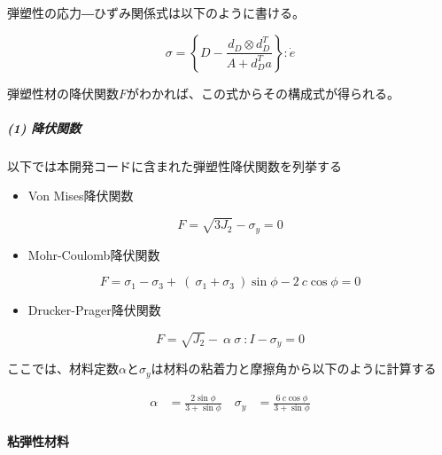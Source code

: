 \documentclass[a4paper,pandoc,ja=standard]{bxjsarticle}
\providecommand{\tightlist}{%
  \setlength{\itemsep}{0pt}\setlength{\parskip}{0pt}}
\let\oldparagraph\paragraph
\renewcommand{\paragraph}[1]{\oldparagraph{#1}\mbox{}}
\let\oldsubparagraph\subparagraph
\renewcommand{\subparagraph}[1]{\oldsubparagraph{#1}\mbox{}}
\begin{document}
弾塑性の応力―ひずみ関係式は以下のように書ける。

\begin{equation}
\sigma = \left\lbrace D - \frac{ d_D \otimes d^T_D}{ A + d^T_D a} \right\rbrace : \dot{e}
\label{eq:2.2.50}
\end{equation}

弾塑性材の降伏関数\(F\)がわかれば、この式からその構成式が得られる。

\hypertarget{ux964dux4f0fux95a2ux6570}{%
\subparagraph{(1) 降伏関数}\label{ux964dux4f0fux95a2ux6570}}

以下では本開発コードに含まれた弾塑性降伏関数を列挙する

\begin{itemize}
\tightlist
\item
  Von Mises降伏関数
\end{itemize}

\begin{equation}
F = \sqrt{3 J_2} - \sigma_y = 0
\label{2.2.51}
\end{equation}

\begin{itemize}
\tightlist
\item
  Mohr-Coulomb降伏関数
\end{itemize}

\begin{equation}
F = \sigma_1 - \sigma_3 + \ ( \ \sigma_1 + \sigma_3\  )\sin \phi - 2 \ c \cos \phi = 0
\label{eq:2.2.52}
\end{equation}

\begin{itemize}
\tightlist
\item
  Drucker-Prager降伏関数
\end{itemize}

\begin{equation}
F = \sqrt{J_2} - \ \alpha\ \sigma \ : I - \sigma_y = 0
\label{eq:2.2.53}
\end{equation}

ここでは、材料定数\(\alpha\)と\(\sigma_{y}\)は材料の粘着力と摩擦角から以下のように計算する

\begin{align}
  \alpha &= \frac{2 \sin \phi}{3 + \sin \phi}\
& \sigma_y &= \frac{6\ c \cos \phi}{3 + \sin \phi}
\label{eq:2.2.54}
\end{align}

\hypertarget{ux7c98ux5f3eux6027ux6750ux6599}{%
\paragraph{粘弾性材料}\label{ux7c98ux5f3eux6027ux6750ux6599}}
\end{document}
